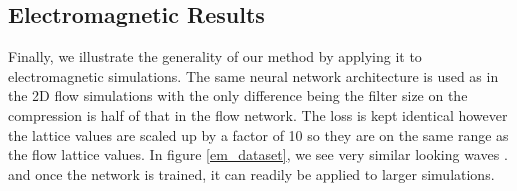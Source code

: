 \documentclass{article}
\begin{document}




\subsection{Electromagnetic Results}

Finally, we illustrate the generality of our method by applying it to electromagnetic simulations. The same neural network architecture is used as in the 2D flow simulations with the only difference being the filter size on the compression is half of that in the flow network. The loss is kept identical however the lattice values are scaled up by a factor of 10 so they are on the same range as the flow lattice values. In figure \ref{em_dataset}, we see very similar looking waves . and once the network is trained, it can readily be applied to larger simulations.
\end{document}
